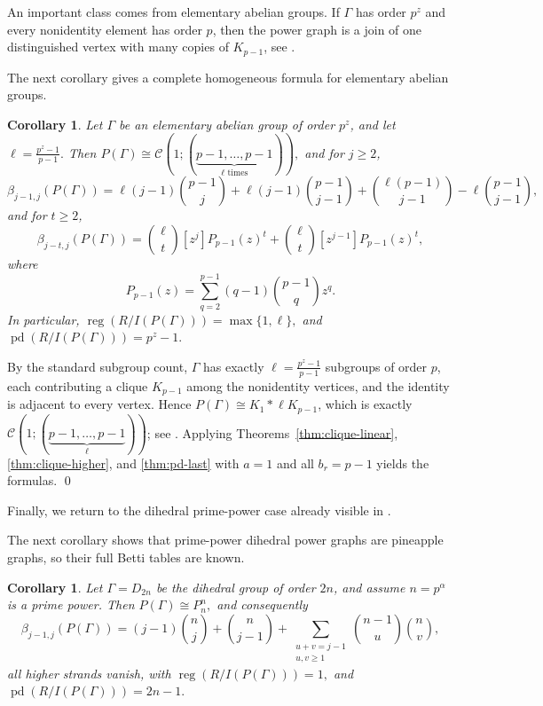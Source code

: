 \documentclass[12pt]{article}
\renewenvironment{proof}{{\bf \noindent Proof.}}{\qed}
\newtheorem{corollary}[theorem]{Corollary}
\theoremstyle{definition}
\theoremstyle{remark}
\DeclareMathOperator{\reg}{reg}
\DeclareMathOperator{\pd}{pd}
\newcommand{\CC}{\mathcal{C}}
\begin{document}
	
	An important class comes from elementary abelian groups. If $\Gamma$ has order $p^z$ and every nonidentity element has order $p$, then the power graph is a join of one distinguished vertex with many copies of $K_{p-1}$, see \cite{ChelvamSattanathan2013,Rather2024}.
	
	\medskip The next corollary gives a complete homogeneous formula for elementary abelian groups.
	
	\begin{corollary}\label{cor:elementary}
		Let $\Gamma$ be an elementary abelian group of order $p^z$, and let
		$ \ell=\frac{p^z-1}{p-1}. $
		Then
		$ P(\Gamma)\cong \CC(1;(\underbrace{p-1,\dots,p-1}_{\ell\text{ times}})),$ and for   $j\geq 2$,
		$$
		\beta_{j-1,j}(P(\Gamma))
		= \ell (j-1)\binom{p-1}{j}
		+
		\ell (j-1)\binom{p-1}{j-1}
		+
		\binom{\ell(p-1)}{j-1}
		- \ell \binom{p-1}{j-1},
		$$
		and for $t\geq 2$,
		$$
		\beta_{j-t,j}(P(\Gamma))
		= \binom{\ell}{t}[z^j]P_{p-1}(z)^t
		+
		\binom{\ell}{t}[z^{j-1}]P_{p-1}(z)^t,
		$$
		where
		$$
		P_{p-1}(z)=\sum_{q=2}^{p-1}(q-1)\binom{p-1}{q}z^q.
		$$
		In particular,
		$ \reg(R/I(P(\Gamma)))=\max\{1,\ell\},$ and $
		\pd(R/I(P(\Gamma)))=p^z-1. $
	\end{corollary}
	
	\begin{proof}
		By the standard subgroup count, $\Gamma$ has exactly $\ell=\tfrac{p^z-1}{p-1}$ subgroups of order $p$, each contributing a clique $K_{p-1}$ among the nonidentity vertices, and the identity is adjacent to every vertex. Hence $P(\Gamma)\cong K_1*\ell K_{p-1}$, which is exactly $\CC(1;(\underbrace{p-1,\dots,p-1}_{\ell}) )$; see \cite{ChelvamSattanathan2013,Rather2024}. Applying Theorems~\ref{thm:clique-linear}, \ref{thm:clique-higher}, and \ref{thm:pd-last} with $a=1$ and all $b_r=p-1$ yields the formulas.
	\end{proof}
	
	Finally, we return to the dihedral prime-power case already visible in \cite{Rather2024}.
	
	\medskip The next corollary shows that prime-power dihedral power graphs are pineapple graphs, so their full Betti tables are known.
	
	\begin{corollary}\label{cor:dihedral}
		Let $\Gamma=D_{2n}$ be the dihedral group of order $2n$, and assume $n=p^\alpha$ is a prime power. Then
		$ P(\Gamma)\cong P_n^n, $ and consequently
		$$
		\beta_{j-1,j}(P(\Gamma))
		= (j-1)\binom{n}{j}
		+
		\binom{n}{j-1}
		+
		\sum_{\substack{u+v=j-1\\ u,v\geq 1}}
		\binom{n-1}{u}\binom{n}{v},
		$$
		all higher strands vanish, with 
		$ \reg(R/I(P(\Gamma)))=1,$ and $ \pd(R/I(P(\Gamma)))=2n-1. $
	\end{corollary}
	
\end{document}
